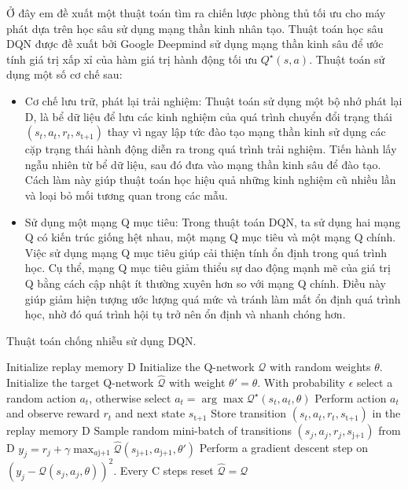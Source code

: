 \documentclass{uetgraduation}
\begin{document}
Ở đây em đề xuất một thuật toán tìm ra chiến lược phòng thủ tối ưu cho máy phát dựa trên học sâu sử dụng mạng thần kinh nhân tạo. Thuật toán học sâu DQN được đề xuất bởi Google Deepmind 
sử dụng mạng thần kinh sâu để ước tính giá trị xấp xỉ của hàm giá trị hành động tối ưu $Q^\star (s, a)$. Thuật toán sử dụng một số cơ chế sau:
\begin{itemize}
    \item Cơ chế lưu trữ, phát lại trải nghiệm: Thuật toán sử dụng một bộ nhớ phát lại D, là bể dữ liệu để lưu các kinh nghiệm của quá trình chuyển đổi trạng thái $(s_t, a_t, r_t, s_\text{t+1})$
    thay vì ngay lập tức đào tạo mạng thần kinh sử dụng các cặp trạng thái hành động diễn ra trong quá trình trải nghiệm. Tiến hành lấy ngẫu nhiên từ bể dữ liệu, sau đó đưa vào
    mạng thần kinh sâu để đào tạo. Cách làm này giúp thuật toán học hiệu quả những kinh nghiệm cũ nhiều lần và loại bỏ mối tương quan trong các mẫu.

    \item  Sử dụng một mạng Q mục tiêu: Trong thuật toán DQN, ta sử dụng hai mạng Q có kiến trúc giống hệt nhau, một mạng Q mục tiêu và một mạng Q chính. Việc sử dụng mạng Q 
    mục tiêu giúp cải thiện tính ổn định trong quá trình học. Cụ thể, mạng Q mục tiêu giảm thiểu sự dao động mạnh mẽ của giá trị Q bằng cách cập nhật ít thường xuyên hơn so với
    mạng Q chính. Điều này giúp giảm hiện tượng ước lượng quá mức và tránh làm mất ổn định quá trình học, nhờ đó quá trình hội tụ trở nên ổn định và nhanh chóng hơn.
\end{itemize}

\begin{algorithm}
    \caption{Thuật toán chống nhiễu sử dụng DQN.}\label{alg:dqn}
    \begin{algorithmic}[1]
    \State Initialize replay memory D
    \State Initialize the Q-network $\mathcal{Q}$ with random weights $\theta$.
    \State Initialize the target Q-network $\hat{\mathcal{Q}}$ with weight $\theta' = \theta$.
        \State With probability $\epsilon$ select a random action $a_t$, otherwise select $a_t = \arg \max \mathcal{Q}^\star (s_t, a_t, \theta)$
        \State Perform action $a_t$ and observe reward $r_t$ and next state $s_\text{t+1}$
        \State Store transition $(s_t,a_t,r_t,s_\text{t+1})$ in the replay memory D
        \State Sample random mini-batch of transitions $(s_j,a_j,r_j,s_\text{j+1})$ from D
        \State $y_j = r_j + \gamma \max_{a\text{j+1}} \hat{\mathcal{Q}} (s_\text{j+1}, a_\text{j+1}, \theta')$
        \State Perform a gradient descent step on $(y_j - \mathcal{Q} (s_j, a_j, \theta))^2$.
        \State Every C steps reset $\hat{\mathcal{Q}} = \mathcal{Q}$
    \EndFor
\end{algorithmic}
\end{algorithm}
\end{document}
